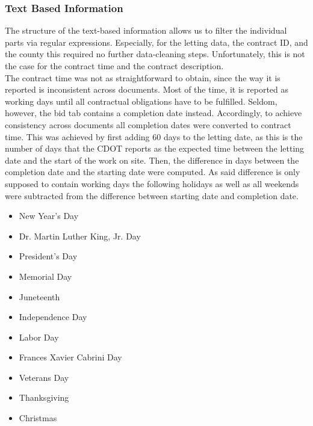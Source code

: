 \documentclass[a4paper,12pt, headsepline]{scrartcl}
\numberwithin{equation}{section}
\begin{document}
\subsubsection{Text Based Information}\label{subsubsec:descr}
 The structure of the text-based information allows us to filter the individual parts via regular expressions. Especially, for the letting data, the contract ID, and the county this required no further data-cleaning steps. Unfortunately, this is not the case for the contract time and the contract description.\\ 
 The contract time was not as straightforward to obtain, since the way it is reported is inconsistent across documents. Most of the time, it is reported as working days until all contractual obligations have to be fulfilled. Seldom, however, the bid tab contains a completion date instead. Accordingly, to achieve consistency across documents all completion dates were converted to contract time. This was achieved by first adding 60 days to the letting date, as this is the number of days that the CDOT reports as the expected time between the letting date and the start of the work on site. Then, the difference in days between the completion date and the starting date were computed. As said difference is only supposed to contain working days the following holidays as well as all weekends were subtracted from the difference between starting date and completion date.
 
 \begin{itemize}
 	\item New Year's Day
 	\item Dr. Martin Luther King, Jr. Day
 	\item President's Day
 	\item Memorial Day
 	\item Juneteenth
 	\item Independence Day
 	\item Labor Day
 	\item Frances Xavier Cabrini Day
 	\item Veterans Day
 	\item Thanksgiving
 	\item Christmas
 \end{itemize}
 
\end{document}

